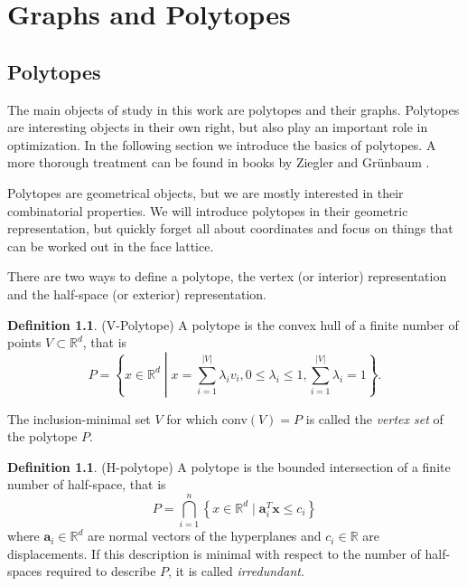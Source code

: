 \documentclass[a4paper,12pt]{book}
\theoremstyle{plain}
\theoremstyle{definition}
\newtheorem{definition}[theorem]{Definition}
\begin{document}
\chapter{Graphs and Polytopes}
\label{mathchapter}

\section{Polytopes}

The main objects of study in this work are polytopes and their graphs. Polytopes are 
interesting 
objects in their own right, but also play an important role in
optimization. In the following section we introduce the basics of polytopes. 
A more thorough treatment can be found in books by Ziegler \cite{PolyLec} 
and Gr\"unbaum \cite{Grunbaum69convexpolytopes}. 

Polytopes are geometrical objects, but we are mostly interested in their combinatorial properties.
We will introduce polytopes in their geometric representation, but quickly forget all about coordinates
and focus on things that can be worked out in the face lattice.

There are two ways to define a polytope, the vertex (or interior) representation and the 
half-space (or exterior) representation.

\begin{definition}
(V-Polytope) A polytope is the convex hull of a finite number of points $V 
\subset \mathbb{R}^d$, that is 
\begin{equation}
 P = \left\{x\in \mathbb{R}^d \middle| x = \sum_{i=1}^{|V|} \lambda_i v_i, 
0\leq \lambda_i \leq 1, \sum_{i=1}^{|V|} \lambda_i = 1 \right\}.
\end{equation}

The inclusion-minimal set $V$ for which conv$(V) = P$ is called the
\emph{vertex set} of the polytope $P$. 

\end{definition}

\begin{definition}
 (H-polytope) A polytope is the bounded intersection of a finite number of 
half-space, that is
\begin{equation}
 P = \bigcap_{i=1}^n \left\{x \in \mathbb{R}^d \mid \mathbf{a}_i^T \mathbf{x} 
\leq 
c_i \right\}
\end{equation}
where $\mathbf{a}_i \in \mathbb{R}^d$ are normal vectors of the hyperplanes and 
$c_i \in 
\mathbb{R}$ are displacements. If this description is minimal with respect to 
the number of half-spaces required to describe $P$, it is called 
\textit{irredundant}.
\end{definition}
\end{document}
